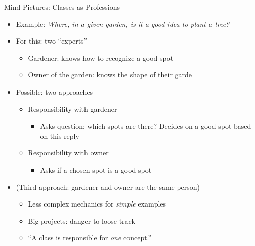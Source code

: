 \begin{frame}{Mind-Pictures: Classes as Professions}
%
\begin{itemize}
\item Example: \emph{Where, in a given garden, is it a good idea to plant a tree?}
\item For this: two \enquote{experts}
	\begin{itemize}
	\item Gardener: knows how to recognize a good spot
	\item Owner of the garden: knows the shape of their garde
	\end{itemize}
\item Possible: two approaches
	\begin{itemize}
	\item Responsibility with gardener
		\begin{itemize}
		\item Asks question: which spots are there? Decides on a good spot based on this reply
		\end{itemize}
	\item Responsibility with owner
		\begin{itemize}
		\item Asks if a chosen spot is a good spot
		\end{itemize}
	\end{itemize}
\item (Third approach: gardener and owner are the same person)
	\begin{itemize}
	\item Less complex mechanics for \emph{simple} examples
	\item Big projects: danger to loose track
	\item \enquote{A class is responsible for \emph{one} concept.}
	\end{itemize}
\end{itemize}
%
\end{frame}


